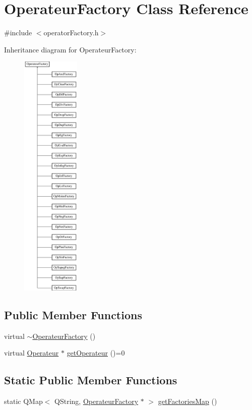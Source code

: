 \hypertarget{class_operateur_factory}{}\section{Operateur\+Factory Class Reference}
\label{class_operateur_factory}


{\ttfamily \#include $<$operator\+Factory.\+h$>$}

Inheritance diagram for Operateur\+Factory\+:\begin{figure}[H]
\begin{center}
\leavevmode
\includegraphics[height=12.000000cm]{class_operateur_factory}
\end{center}
\end{figure}
\subsection*{Public Member Functions}
\begin{DoxyCompactItemize}
\item 
virtual \hyperlink{class_operateur_factory_a2f1c0540a6b9605d1f9ab991c74f92f5}{$\sim$\+Operateur\+Factory} ()
\item 
virtual \hyperlink{class_operateur}{Operateur} $\ast$ \hyperlink{class_operateur_factory_aff61b2f67451f086d6abaea4231b2d78}{get\+Operateur} ()=0
\end{DoxyCompactItemize}
\subsection*{Static Public Member Functions}
\begin{DoxyCompactItemize}
\item 
static Q\+Map$<$ Q\+String, \hyperlink{class_operateur_factory}{Operateur\+Factory} $\ast$ $>$ \hyperlink{class_operateur_factory_a47799a289befae26b8bf162f78bc065c}{get\+Factories\+Map} ()
\end{DoxyCompactItemize}


